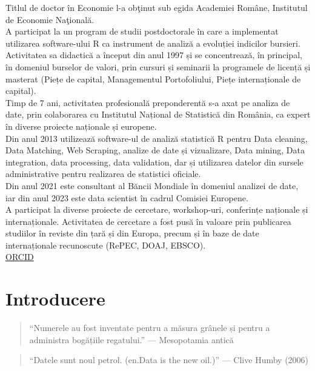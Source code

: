 \documentclass[
  11pt,
  b5paper,
  nottoc]{book}
\begin{document}
Titlul de doctor în Economie l-a obţinut sub egida Academiei Române,
Institutul de Economie Naţională.\\
A participat la un program de studii postdoctorale în care a implementat
utilizarea software-ului R ca instrument de analiză a evoluției
indicilor bursieri.\\
Activitatea sa didactică a început din anul 1997 și se concentrează, în
principal, în domeniul burselor de valori, prin cursuri și seminarii la
programele de licență și masterat (Piețe de capital, Managementul
Portofoliului, Piețe internaționale de capital).\\
Timp de 7 ani, activitatea profesională preponderentă s-a axat pe
analiza de date, prin colaborarea cu Institutul Național de Statistică
din România, ca expert în diverse proiecte naționale și europene.\\
Din anul 2013 utilizează software-ul de analiză statistică R pentru Data
cleaning, Data Matching, Web Scraping, analize de date și vizualizare,
Data mining, Data integration, data processing, data validation, dar și
utilizarea datelor din sursele administrative pentru realizarea de
statistici oficiale.\\
Din anul 2021 este consultant al Băncii Mondiale în domeniul analizei de
date, iar din anul 2023 este data scientist în cadrul Comisiei
Europene.\\
A participat la diverse proiecte de cercetare, workshop-uri, conferințe
naționale și internaționale. Activitatea de cercetare a fost pusă în
valoare prin publicarea studiilor în reviste din țară și din Europa,
precum și în baze de date internaționale recunoscute (RePEC, DOAJ,
EBSCO).\\

\href{https://orcid.org/0000-0001-8215-6671}{ORCID}


\chapter*{Introducere}\label{introducere}


\begin{quote}
``Numerele au fost inventate pentru a măsura grânele și pentru a
administra bogățiile regatului.'' --- Mesopotamia antică
\end{quote}

\begin{quote}
``Datele sunt noul petrol. (en.Data is the new oil.)'' --- Clive Humby
(2006)
\end{quote}
\end{document}
